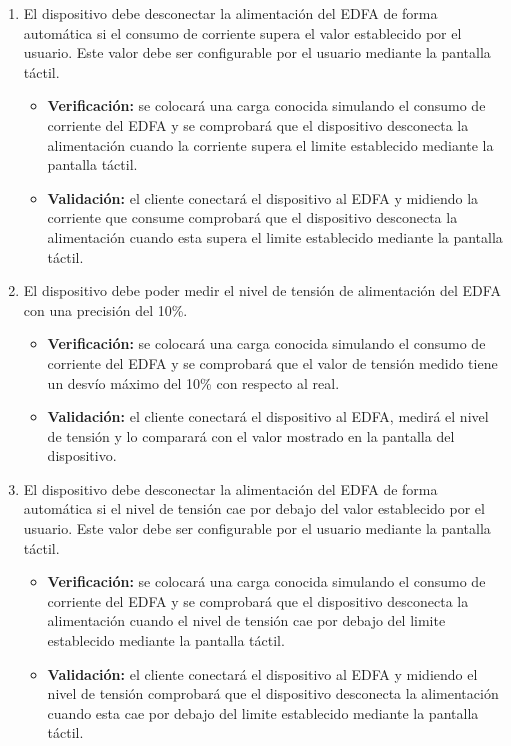 \documentclass[
11pt, %
codirector, %
]{charter}
\begin{document}
\begin{enumerate}
\begin{enumerate}
\begin{enumerate}[label*=\arabic*.]
\item El dispositivo debe desconectar la alimentación del EDFA de forma automática si el consumo de corriente supera el valor establecido por el usuario. Este valor debe ser configurable por el usuario mediante la pantalla táctil.
\begin{itemize}
	\item \textbf{Verificación:} se colocará una carga conocida simulando el consumo de corriente del EDFA y se comprobará que el dispositivo desconecta la alimentación cuando la corriente supera el limite establecido mediante la pantalla táctil.
	\item \textbf{Validación:} el cliente conectará el dispositivo al EDFA y midiendo la corriente que consume comprobará que el dispositivo desconecta la alimentación cuando esta supera el limite establecido mediante la pantalla táctil.
\end{itemize}

\item El dispositivo debe poder medir el nivel de tensión de alimentación del EDFA con una precisión del 10\%.
\begin{itemize}
	\item \textbf{Verificación:} se colocará una carga conocida simulando el consumo de corriente del EDFA y se comprobará que el valor de tensión medido tiene un desvío máximo del 10\% con respecto al real.
	\item \textbf{Validación:} el cliente conectará el dispositivo al EDFA, medirá el nivel de tensión y lo comparará con el valor mostrado en la pantalla del dispositivo.
\end{itemize}

\item El dispositivo debe desconectar la alimentación del EDFA de forma automática si el nivel de tensión cae por debajo del valor establecido por el usuario. Este valor debe ser configurable por el usuario mediante la pantalla táctil.
\begin{itemize}
	\item \textbf{Verificación:} se colocará una carga conocida simulando el consumo de corriente del EDFA y se comprobará que el dispositivo desconecta la alimentación cuando el nivel de tensión cae por debajo del limite establecido mediante la pantalla táctil.
	\item \textbf{Validación:} el cliente conectará el dispositivo al EDFA y midiendo el nivel de tensión comprobará que el dispositivo desconecta la alimentación cuando esta cae por debajo del limite establecido mediante la pantalla táctil.
\end{itemize}


\end{enumerate}
\end{enumerate}
\end{enumerate}
\end{document}
